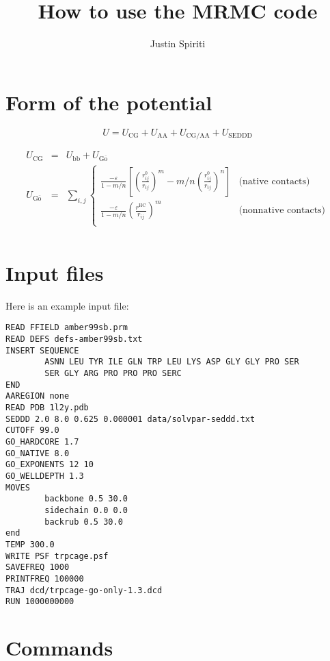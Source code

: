 \documentclass{article}      %
\title{How to use the MRMC code}  %
\author{Justin Spiriti}      %
\begin{document}

\maketitle                   %

\section{Form of the potential}

\begin{equation}
U = U_\mathrm{CG} + U_\mathrm{AA} + U_\mathrm{CG/AA} + U_\mathrm{SEDDD}
\end{equation}

\begin{eqnarray}
U_\mathrm{CG} &=& U_\mathrm{bb} + U_\mathrm{G\overline{o}} \\
U_\mathrm{G\overline{o}} &=& \sum_{i,j} \left\{
\begin{array}{ll}
\frac{-\varepsilon}{1-m/n} \left[\left(\frac{r^0_{ij}}{r_{ij}}\right)^{m}-m/n\left(\frac{r^0_{ij}}{r_{ij}}\right)^{n}\right] & \textrm{(native contacts)} \\
\frac{-\varepsilon}{1-m/n} \left(\frac{r^\mathrm{HC}}{r_{ij}}\right)^{m}& \textrm{(nonnative contacts)} \\
\end{array}
\right. \\
\end{eqnarray}

\section{Input files}
Here is an example input file:
\begin{verbatim}
READ FFIELD amber99sb.prm
READ DEFS defs-amber99sb.txt
INSERT SEQUENCE
        ASNN LEU TYR ILE GLN TRP LEU LYS ASP GLY GLY PRO SER
        SER GLY ARG PRO PRO PRO SERC
END
AAREGION none
READ PDB 1l2y.pdb
SEDDD 2.0 8.0 0.625 0.000001 data/solvpar-seddd.txt
CUTOFF 99.0
GO_HARDCORE 1.7
GO_NATIVE 8.0
GO_EXPONENTS 12 10
GO_WELLDEPTH 1.3
MOVES
        backbone 0.5 30.0
        sidechain 0.0 0.0
        backrub 0.5 30.0
end
TEMP 300.0
WRITE PSF trpcage.psf
SAVEFREQ 1000
PRINTFREQ 100000
TRAJ dcd/trpcage-go-only-1.3.dcd
RUN 1000000000
\end{verbatim}

\section{Commands}
\end{document}
